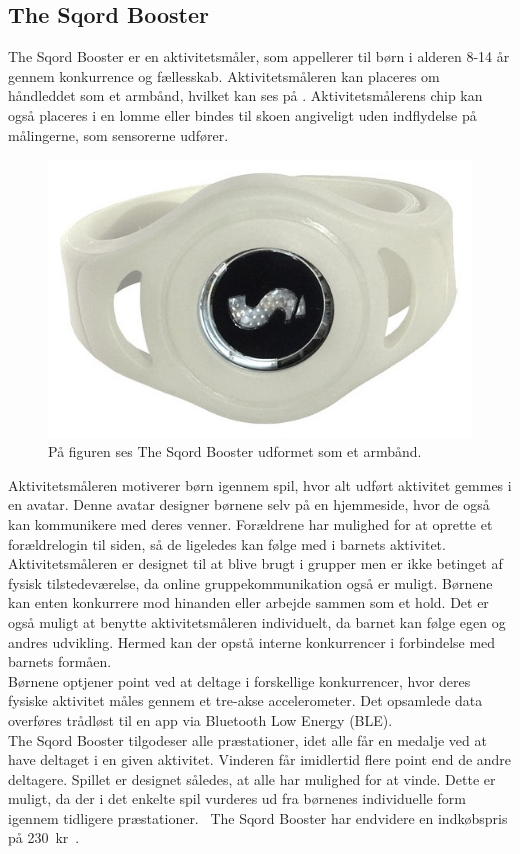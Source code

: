 \subsection{The Sqord Booster}
The Sqord Booster er en aktivitetsmåler, som appellerer til børn i alderen 8-14 år gennem konkurrence og fællesskab. Aktivitetsmåleren kan placeres om håndleddet som et armbånd, hvilket kan ses på . Aktivitetsmålerens chip kan også placeres i en lomme eller bindes til skoen angiveligt uden indflydelse på målingerne, som sensorerne udfører. 
\begin{figure}[H]
	\centering
	\includegraphics[scale=0.21]{figures/aProblemanalyse/sqord.JPG}
	\caption{På figuren ses The Sqord Booster udformet som et armbånd.~\citep{Sqord2016}}
	\label{fig:sqord}
\end{figure}\vspace{-.25cm}
Aktivitetsmåleren motiverer børn igennem spil, hvor alt udført aktivitet gemmes i en avatar. Denne avatar designer børnene selv på en hjemmeside, hvor de også kan kommunikere med deres venner. Forældrene har mulighed for at oprette et forældrelogin til siden, så de ligeledes kan følge med i barnets aktivitet. Aktivitetsmåleren er designet til at blive brugt i grupper men er ikke betinget af fysisk tilstedeværelse, da online gruppekommunikation også er muligt. Børnene kan enten konkurrere mod hinanden eller arbejde sammen som et hold. Det er også muligt at benytte aktivitetsmåleren individuelt, da barnet kan følge egen og andres udvikling. Hermed kan der opstå interne konkurrencer i forbindelse med barnets formåen. \citep{Sqord_family2015,Sqord_group2015} \\
Børnene optjener point ved at deltage i forskellige konkurrencer, hvor deres fysiske aktivitet måles gennem et tre-akse accelerometer. Det opsamlede data overføres trådløst til en app via Bluetooth Low Energy (BLE).~\citep{Sqord_family2015} \\
The Sqord Booster tilgodeser alle præstationer, idet alle får en medalje ved at have deltaget i en given aktivitet. Vinderen får imidlertid flere point end de andre deltagere. Spillet er designet således, at alle har mulighed for at vinde. Dette er muligt, da der i det enkelte spil vurderes ud fra børnenes individuelle form igennem tidligere præstationer.~\citep{Sqord_family2015} \newline
The Sqord Booster har endvidere en indkøbspris på 230~kr~\citep{Sqord_family2015}. 

